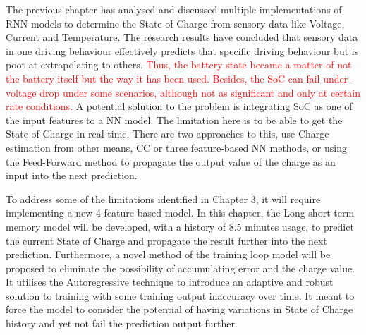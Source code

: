 
%
%
The previous chapter has analysed and discussed multiple implementations of RNN models to determine the State of Charge from sensory data like Voltage, Current and Temperature.
The research results have concluded that sensory data in one driving behaviour effectively predicts that specific driving behaviour but is poot at extrapolating to others.
\textcolor{red}{Thus, the battery state became a matter of not the battery itself but the way it has been used.
Besides, the SoC can fail under-voltage drop under some scenarios, although not as significant and only at certain rate conditions.}
A potential solution to the problem is integrating SoC as one of the input features to a NN model.
The limitation here is to be able to get the State of Charge in real-time.
There are two approaches to this, use Charge estimation from other means, CC or three feature-based NN methods, or using the Feed-Forward method to propagate the output value of the charge as an input into the next prediction.

%
%
To address some of the limitations identified in Chapter 3, it will require implementing a new 4-feature based model.
In this chapter, the Long short-term memory model will be developed, with a history of 8.5 minutes usage, to predict the current State of Charge and propagate the result further into the next prediction.
Furthermore, a novel method of the training loop model will be proposed to eliminate the possibility of accumulating error and the charge value.
It utilises the Autoregressive technique to introduce an adaptive and robust solution to training with some training output inaccuracy over time.
It meant to force the model to consider the potential of having variations in State of Charge history and yet not fail the prediction output further.

